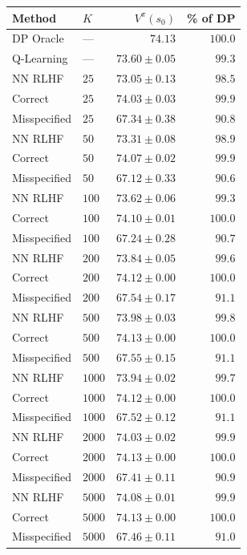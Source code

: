 \begin{tabular}{llrr}
\hline
Method & $K$ & $V^\pi(s_0)$ & \% of DP \\
\hline
DP Oracle & --- & $74.13$ & $100.0$ \\
Q-Learning & --- & $73.60 \pm 0.05$ & $99.3$ \\
\hline
NN RLHF & $25$ & $73.05 \pm 0.13$ & $98.5$ \\
Correct & $25$ & $74.03 \pm 0.03$ & $99.9$ \\
Misspecified & $25$ & $67.34 \pm 0.38$ & $90.8$ \\
\hline
NN RLHF & $50$ & $73.31 \pm 0.08$ & $98.9$ \\
Correct & $50$ & $74.07 \pm 0.02$ & $99.9$ \\
Misspecified & $50$ & $67.12 \pm 0.33$ & $90.6$ \\
\hline
NN RLHF & $100$ & $73.62 \pm 0.06$ & $99.3$ \\
Correct & $100$ & $74.10 \pm 0.01$ & $100.0$ \\
Misspecified & $100$ & $67.24 \pm 0.28$ & $90.7$ \\
\hline
NN RLHF & $200$ & $73.84 \pm 0.05$ & $99.6$ \\
Correct & $200$ & $74.12 \pm 0.00$ & $100.0$ \\
Misspecified & $200$ & $67.54 \pm 0.17$ & $91.1$ \\
\hline
NN RLHF & $500$ & $73.98 \pm 0.03$ & $99.8$ \\
Correct & $500$ & $74.13 \pm 0.00$ & $100.0$ \\
Misspecified & $500$ & $67.55 \pm 0.15$ & $91.1$ \\
\hline
NN RLHF & $1000$ & $73.94 \pm 0.02$ & $99.7$ \\
Correct & $1000$ & $74.12 \pm 0.00$ & $100.0$ \\
Misspecified & $1000$ & $67.52 \pm 0.12$ & $91.1$ \\
\hline
NN RLHF & $2000$ & $74.03 \pm 0.02$ & $99.9$ \\
Correct & $2000$ & $74.13 \pm 0.00$ & $100.0$ \\
Misspecified & $2000$ & $67.41 \pm 0.11$ & $90.9$ \\
\hline
NN RLHF & $5000$ & $74.08 \pm 0.01$ & $99.9$ \\
Correct & $5000$ & $74.13 \pm 0.00$ & $100.0$ \\
Misspecified & $5000$ & $67.46 \pm 0.11$ & $91.0$ \\
\hline
\end{tabular}
